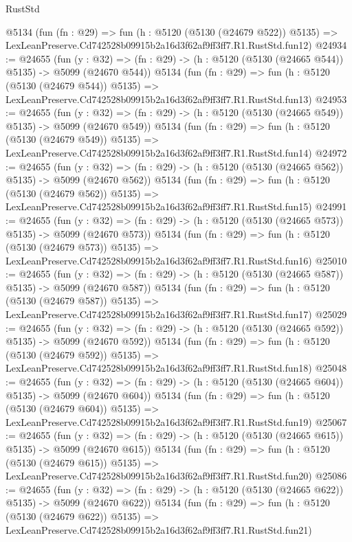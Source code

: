 \begin{lexlean}{RustStd}
\begin{coremodule}
    @5134
    (fun (fn : @29) =>
    fun (h : @5120 (@5130 (@24679 @522)) @5135) =>
    LexLeanPreserve.Cd742528b09915b2a16d3f62af9ff3ff7.R1.RustStd.fun12)
@24934 := @24655
    (fun (y : @32) => (fn : @29) -> (h : @5120 (@5130 (@24665 @544)) @5135) -> @5099 (@24670 @544))
    @5134
    (fun (fn : @29) =>
    fun (h : @5120 (@5130 (@24679 @544)) @5135) =>
    LexLeanPreserve.Cd742528b09915b2a16d3f62af9ff3ff7.R1.RustStd.fun13)
@24953 := @24655
    (fun (y : @32) => (fn : @29) -> (h : @5120 (@5130 (@24665 @549)) @5135) -> @5099 (@24670 @549))
    @5134
    (fun (fn : @29) =>
    fun (h : @5120 (@5130 (@24679 @549)) @5135) =>
    LexLeanPreserve.Cd742528b09915b2a16d3f62af9ff3ff7.R1.RustStd.fun14)
@24972 := @24655
    (fun (y : @32) => (fn : @29) -> (h : @5120 (@5130 (@24665 @562)) @5135) -> @5099 (@24670 @562))
    @5134
    (fun (fn : @29) =>
    fun (h : @5120 (@5130 (@24679 @562)) @5135) =>
    LexLeanPreserve.Cd742528b09915b2a16d3f62af9ff3ff7.R1.RustStd.fun15)
@24991 := @24655
    (fun (y : @32) => (fn : @29) -> (h : @5120 (@5130 (@24665 @573)) @5135) -> @5099 (@24670 @573))
    @5134
    (fun (fn : @29) =>
    fun (h : @5120 (@5130 (@24679 @573)) @5135) =>
    LexLeanPreserve.Cd742528b09915b2a16d3f62af9ff3ff7.R1.RustStd.fun16)
@25010 := @24655
    (fun (y : @32) => (fn : @29) -> (h : @5120 (@5130 (@24665 @587)) @5135) -> @5099 (@24670 @587))
    @5134
    (fun (fn : @29) =>
    fun (h : @5120 (@5130 (@24679 @587)) @5135) =>
    LexLeanPreserve.Cd742528b09915b2a16d3f62af9ff3ff7.R1.RustStd.fun17)
@25029 := @24655
    (fun (y : @32) => (fn : @29) -> (h : @5120 (@5130 (@24665 @592)) @5135) -> @5099 (@24670 @592))
    @5134
    (fun (fn : @29) =>
    fun (h : @5120 (@5130 (@24679 @592)) @5135) =>
    LexLeanPreserve.Cd742528b09915b2a16d3f62af9ff3ff7.R1.RustStd.fun18)
@25048 := @24655
    (fun (y : @32) => (fn : @29) -> (h : @5120 (@5130 (@24665 @604)) @5135) -> @5099 (@24670 @604))
    @5134
    (fun (fn : @29) =>
    fun (h : @5120 (@5130 (@24679 @604)) @5135) =>
    LexLeanPreserve.Cd742528b09915b2a16d3f62af9ff3ff7.R1.RustStd.fun19)
@25067 := @24655
    (fun (y : @32) => (fn : @29) -> (h : @5120 (@5130 (@24665 @615)) @5135) -> @5099 (@24670 @615))
    @5134
    (fun (fn : @29) =>
    fun (h : @5120 (@5130 (@24679 @615)) @5135) =>
    LexLeanPreserve.Cd742528b09915b2a16d3f62af9ff3ff7.R1.RustStd.fun20)
@25086 := @24655
    (fun (y : @32) => (fn : @29) -> (h : @5120 (@5130 (@24665 @622)) @5135) -> @5099 (@24670 @622))
    @5134
    (fun (fn : @29) =>
    fun (h : @5120 (@5130 (@24679 @622)) @5135) =>
    LexLeanPreserve.Cd742528b09915b2a16d3f62af9ff3ff7.R1.RustStd.fun21)

\end{coremodule}
\end{lexlean}
